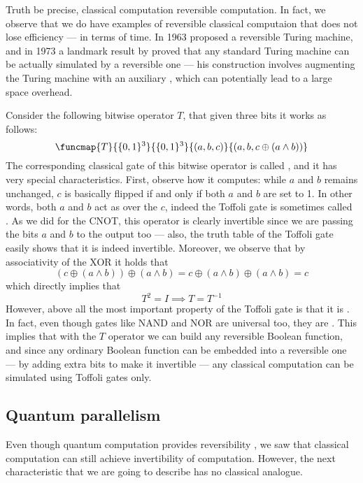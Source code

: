 \documentclass[a4paper, 12pt]{report}
\begin{document}
Truth be precise, classical computation  reversible computation. In fact, we observe that we do have examples of reversible classical computaion that does not lose efficiency --- in terms of time. In 1963 \textcite{lecerf} proposed a reversible Turing machine, and in 1973 a landmark result by \textcite{bennett} proved that any standard Turing machine can be actually simulated by a reversible one --- his construction involves augmenting the Turing machine with an auxiliary , which can potentially lead to a large space overhead.

Consider the following bitwise operator $T$, that given three bits it works as follows: $$\funcmap{T}{\{0, 1\}^3}{\{0, 1\}^3}{(a, b, c)}{(a, b, c \oplus (a \land b))}$$ The corresponding classical gate of this bitwise operator is called , and it has very special characteristics. First, observe how it computes: while $a$ and $b$ remains unchanged, $c$ is basically flipped if and only if both $a$ and $b$ are set to 1. In other words, both $a$ and $b$ act as over the  $c$, indeed the Toffoli gate is sometimes called . As we did for the CNOT, this operator is clearly invertible since we are passing the bits $a$ and $b$ to the output too --- also, the truth table of the Toffoli gate easily shows that it is indeed invertible. Moreover, we observe that by associativity of the XOR it holds that $$(c \oplus (a \land b)) \oplus (a \land b) = c \oplus (a \land b) \oplus (a \land b) = c$$ which directly implies that $$T^2 = I \implies T = T^{-1}$$ However, above all the most important property of the Toffoli gate is that it is . In fact, even though gates like NAND and NOR are universal too, they are . This implies that with the $T$ operator we can build any reversible Boolean function, and since any ordinary Boolean function can be embedded into a reversible one --- by adding extra bits to make it invertible --- any classical computation can be simulated using Toffoli gates only.

\subsection{Quantum parallelism}

Even though quantum computation provides reversibility , we saw that classical computation can still achieve invertibility of computation. However, the next characteristic that we are going to describe has no classical analogue.
\end{document}
